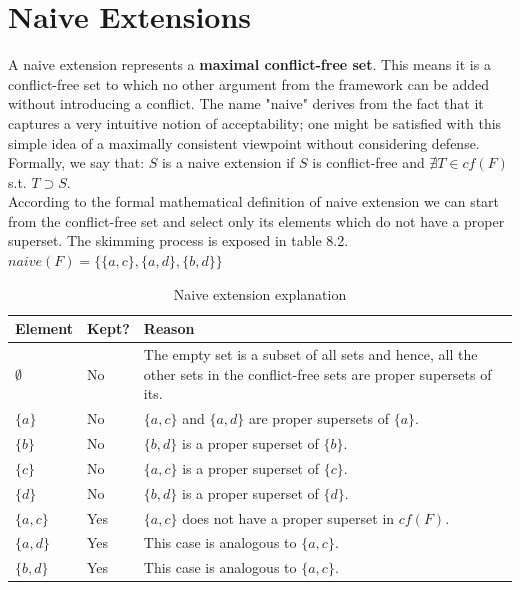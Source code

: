 \documentclass{scrbook}
\begin{document}
\section{Naive Extensions}

A naive extension represents a \textbf{maximal conflict-free set}. This means it is a conflict-free set to which no other argument from the framework can be added without introducing a conflict. The name "naive" derives from the fact that it captures a very intuitive notion of acceptability; one might be satisfied with this simple idea of a maximally consistent viewpoint without considering defense. \\

Formally, we say that: $S$ is a naive extension if $S$ is conflict-free and $\nexists T \in cf(F)$ s.t. $T\supset S$. \\

According to the formal mathematical definition of naive extension we can start from the conflict-free set and select only its elements which do not have a proper superset. The skimming process is exposed in table 8.2.\\

$naive(F) = \{\{a,c\},\{a,d\},\{b,d\}\}$

\begin{table}[]
    \begin{tabularx}{\linewidth}{|p{5em}|p{4em}|X|} \hline
         \textbf{Element} & \textbf{Kept?} & \textbf{Reason} \\ \hline

        $\emptyset$ & No &
        The empty set is a subset of all sets and hence, all the other sets in the conflict-free sets are proper supersets of its. \\ \hline

        $\{a\}$ & No &
        $\{a,c\}$ and $\{a,d\}$ are proper supersets of $\{a\}$.\\ \hline

        $\{b\}$ & No &
        $\{b,d\}$ is a proper superset of $\{b\}$.\\ \hline

        $\{c\}$ & No &
        $\{a,c\}$ is a proper superset of $\{c\}$.\\ \hline

        $\{d\}$ & No &
        $\{b,d\}$ is a proper superset of $\{d\}$.\\ \hline

        $\{a,c\}$ & Yes &
        $\{a,c\}$ does not have a proper superset in  $cf(F)$.\\ \hline

        $\{a,d\}$ & Yes &
        This case is analogous to $\{a,c\}$.\\ \hline

        $\{b,d\}$ & Yes &
        This case is analogous to $\{a,c\}$.\\ \hline
    \end{tabularx}
    \caption{Naive extension explanation}
\end{table}
\end{document}
